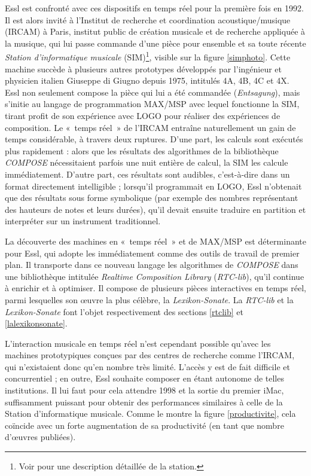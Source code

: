 \documentclass[a4paper,12pt]{article}
\newcommand{\guill}[1]{«~#1~»}
\begin{document}
Essl est confronté avec ces dispositifs en temps réel pour la première fois en 1992. Il est alors invité à l'Institut de recherche et coordination acoustique/musique (IRCAM) à Paris, institut public de création musicale et de recherche appliquée à la musique, qui lui passe commande d'une pièce pour ensemble et sa toute récente \emph{Station d'informatique musicale} (SIM)\footnote{Voir \cite{lippe1991ircam} pour une description détaillée de la station.}, visible sur la figure \ref{simphoto}. Cette machine succède à plusieurs autres prototypes développés par l'ingénieur et physicien italien Giuseppe di Giugno depuis 1975, intitulés 4A, 4B, 4C et 4X. Essl non seulement compose la pièce qui lui a été commandée (\emph{Entsagung}), mais s'initie au langage de programmation MAX/MSP avec lequel fonctionne la SIM, tirant profit de son expérience avec LOGO pour réaliser des expériences de composition. Le \guill{temps réel} de l'IRCAM entraîne naturellement un gain de temps considérable, à travers deux ruptures. D'une part, les calculs sont exécutés plus rapidement : alors que les résultats des algorithmes de la bibliothèque \emph{COMPOSE} nécessitaient parfois une nuit entière de calcul, la SIM les calcule immédiatement. D'autre part, ces résultats sont audibles, c'est-à-dire dans un format directement intelligible ; lorsqu'il programmait en LOGO, Essl n'obtenait que des résultats sous forme symbolique (par exemple des nombres représentant des hauteurs de notes et leurs durées), qu'il devait ensuite traduire en partition et interpréter sur un instrument traditionnel.

La découverte des machines en \guill{temps réel} et de MAX/MSP est déterminante pour Essl, qui adopte les immédiatement comme des outils de travail de premier plan. Il transporte dans ce nouveau langage les algorithmes de \emph{COMPOSE} dans une bibliothèque intitulée \emph{Realtime Composition Library} (\emph{RTC-lib}), qu'il continue à enrichir et à optimiser. Il compose de plusieurs pièces interactives en temps réel, parmi lesquelles son œuvre la plus célèbre, la \emph{Lexikon-Sonate}. La \emph{RTC-lib} et la \emph{Lexikon-Sonate} font l'objet respectivement des sections \ref{rtclib} et \ref{lalexikonsonate}.

L'interaction musicale en temps réel n'est cependant possible qu'avec les machines prototypiques conçues par des centres de recherche comme l'IRCAM, qui n'existaient donc qu'en nombre très limité. L'accès y est de fait difficile et concurrentiel ; en outre, Essl souhaite composer en étant autonome de telles institutions. Il lui faut pour cela attendre 1998 et la sortie du premier iMac, suffisamment puissant pour obtenir des performances similaires à celle de la Station d'informatique musicale. Comme le montre la figure \ref{productivite}, cela coïncide avec un forte augmentation de sa productivité (en tant que nombre d'œuvres publiées).
\end{document}
